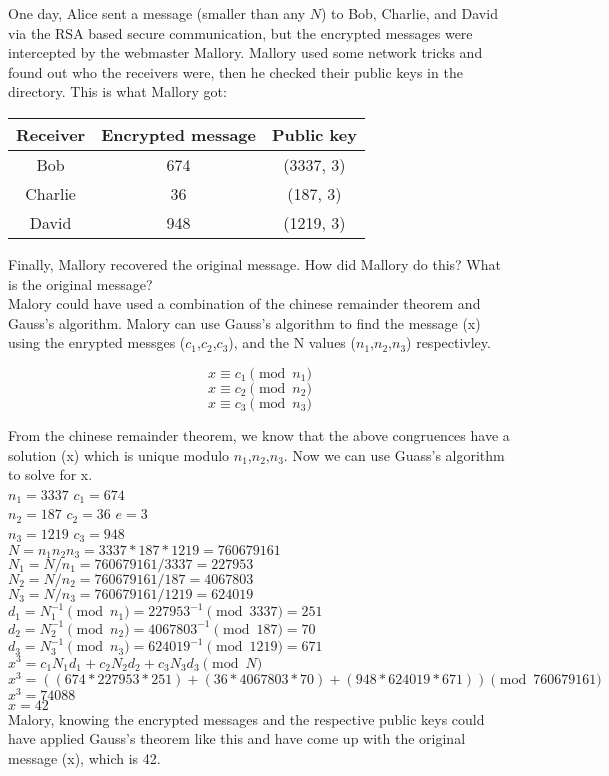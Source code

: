 \documentclass{article}
\begin{document}
\noindent One day, Alice sent a message (smaller than any $N$) to Bob,
Charlie, and David via the RSA based secure communication, but the
encrypted messages were intercepted by the webmaster Mallory. Mallory
used some network tricks and found out who the receivers were, then he
checked their public keys in the directory. This is what Mallory got:

\begin{center}
  \begin{tabular}{ | c | c | c | }
    \hline
    Receiver & Encrypted message & Public key \\ \hline
    Bob & 674 & (3337, 3) \\
    Charlie & 36 & (187, 3) \\
    David & 948 & (1219, 3) \\
    \hline
  \end{tabular}
\end{center}

\noindent Finally, Mallory recovered the original message. How did
Mallory do this? What is the original message?\\

 Malory could have used a combination of
the chinese remainder theorem and Gauss's algorithm. Malory can use Gauss's
algorithm to find the message (x) using the enrypted messges ($c_1$,$c_2$,$c_3$),
and the N values ($n_1$,$n_2$,$n_3$) respectivley.

$$x \equiv c_1 \pmod{n_1}$$
$$x \equiv c_2 \pmod{n_2}$$
$$x \equiv c_3 \pmod{n_3}$$

\noindent From the chinese remainder theorem, we know that the above congruences
have a solution (x) which is unique modulo $n_1$,$n_2$,$n_3$. Now we can use Guass's
algorithm to solve for x.\\

\noindent $n_1 = 3337$ \hspace{1in} $c_1 = 674$\\
$n_2 = 187$ \hspace{1.1in} $c_2 = 36$ \hspace{1in} $e = 3$\\
$n_3 = 1219$ \hspace{1in} $c_3 = 948$\\
$N = n_1n_2n_3 = 3337*187*1219 = 760679161$\\
$N_1 = N/n_1 = 760679161/3337 = 227953$\\
$N_2 = N/n_2 = 760679161/187 = 4067803$\\
$N_3 = N/n_3 = 760679161/1219 = 624019$\\
$d_1 = N_1^{-1} \pmod{n_1} = 227953^{-1} \pmod{3337} = 251$\\
$d_2 = N_2^{-1} \pmod{n_2} = 4067803^{-1} \pmod{187} = 70$\\
$d_3 = N_3^{-1} \pmod{n_3} = 624019^{-1} \pmod{1219} = 671$\\
$x^{3} = c_1N_1d_1 + c_2N_2d_2 + c_3N_3d_3 \pmod {N}$\\
$x^{3} = ((674*227953*251)+(36*4067803*70)+(948*624019*671))\pmod{760679161}$\\
$x^{3} = 74088$\\
$x = 42$\\

\noindent Malory, knowing the encrypted messages and the respective public keys could have
applied Gauss's theorem like this and have come up with the original message (x), which is 42.
\end{document}
